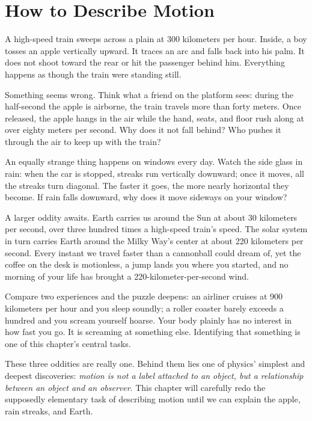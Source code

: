 \chapter{How to Describe Motion}


\begin{mainline}
A high-speed train sweeps across a plain at 300 kilometers per hour. Inside, a boy tosses an apple vertically upward. It traces an arc and falls back into his palm. It does not shoot toward the rear or hit the passenger behind him. Everything happens as though the train were standing still.

Something seems wrong. Think what a friend on the platform sees: during the half-second the apple is airborne, the train travels more than forty meters. Once released, the apple hangs in the air while the hand, seats, and floor rush along at over eighty meters per second. Why does it not fall behind? Who pushes it through the air to keep up with the train?

An equally strange thing happens on windows every day. Watch the side glass in rain: when the car is stopped, streaks run vertically downward; once it moves, all the streaks turn diagonal. The faster it goes, the more nearly horizontal they become. If rain falls downward, why does it move sideways on your window?

A larger oddity awaits. Earth carries us around the Sun at about 30 kilometers per second, over three hundred times a high-speed train's speed. The solar system in turn carries Earth around the Milky Way's center at about 220 kilometers per second. Every instant we travel faster than a cannonball could dream of, yet the coffee on the desk is motionless, a jump lands you where you started, and no morning of your life has brought a 220-kilometer-per-second wind.

Compare two experiences and the puzzle deepens: an airliner cruises at 900 kilometers per hour and you sleep soundly; a roller coaster barely exceeds a hundred and you scream yourself hoarse. Your body plainly has no interest in how fast you go. It is screaming at something else. Identifying that something is one of this chapter's central tasks.

These three oddities are really one. Behind them lies one of physics' simplest and deepest discoveries: \emph{motion is not a label attached to an object, but a relationship between an object and an observer}. This chapter will carefully redo the supposedly elementary task of describing motion until we can explain the apple, rain streaks, and Earth.
\end{mainline}


